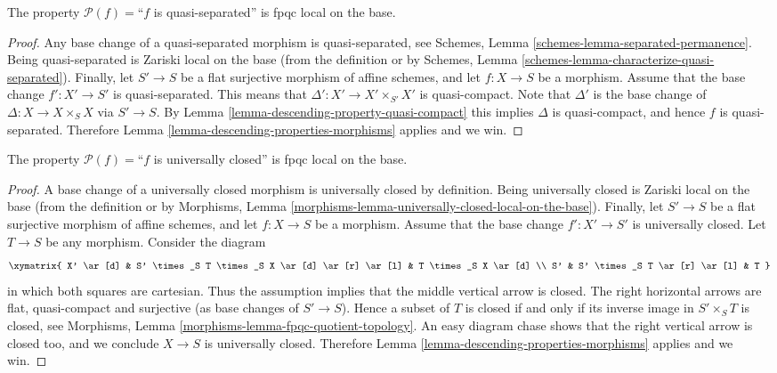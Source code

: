 \begin{lemma}
\label{lemma-descending-property-quasi-separated}
The property $\mathcal{P}(f) =$``$f$ is quasi-separated''
is fpqc local on the base.
\end{lemma}

\begin{proof}
Any base change of a quasi-separated morphism is quasi-separated, see
Schemes, Lemma \ref{schemes-lemma-separated-permanence}.
Being quasi-separated is Zariski local on the base (from the
definition or by
Schemes, Lemma \ref{schemes-lemma-characterize-quasi-separated}).
Finally, let
$S' \to S$ be a flat surjective morphism of affine schemes,
and let $f : X \to S$ be a morphism. Assume that the base change
$f' : X' \to S'$ is quasi-separated. This means that
$\Delta' : X' \to X'\times_{S'} X'$ is quasi-compact.
Note that $\Delta'$ is the base change of $\Delta : X \to X \times_S X$
via $S' \to S$. By Lemma \ref{lemma-descending-property-quasi-compact}
this implies $\Delta$ is quasi-compact, and hence $f$ is
quasi-separated.
Therefore Lemma \ref{lemma-descending-properties-morphisms} applies and we win.
\end{proof}

\begin{lemma}
\label{lemma-descending-property-universally-closed}
The property $\mathcal{P}(f) =$``$f$ is universally closed''
is fpqc local on the base.
\end{lemma}

\begin{proof}
A base change of a universally closed morphism is universally closed
by definition.
Being universally closed is Zariski local on the base (from the
definition or by
Morphisms, Lemma
\ref{morphisms-lemma-universally-closed-local-on-the-base}).
Finally, let
$S' \to S$ be a flat surjective morphism of affine schemes,
and let $f : X \to S$ be a morphism. Assume that the base change
$f' : X' \to S'$ is universally closed. Let $T \to S$ be any morphism.
Consider the diagram
$$
\xymatrix{
X' \ar[d] &
S' \times_S T \times_S X \ar[d] \ar[r] \ar[l] &
T \times_S X \ar[d] \\
S' &
S' \times_S T \ar[r] \ar[l] &
T
}
$$
in which both squares are cartesian.
Thus the assumption implies that the middle vertical
arrow is closed. The right horizontal arrows are flat, quasi-compact
and surjective (as base changes of $S' \to S$).
Hence a subset of $T$ is closed if and only if its inverse
image in $S' \times_S T$ is closed, see Morphisms,
Lemma \ref{morphisms-lemma-fpqc-quotient-topology}.
An easy diagram chase shows that the right vertical
arrow is closed too, and we conclude $X \to S$ is
universally closed.
Therefore Lemma \ref{lemma-descending-properties-morphisms} applies and we win.
\end{proof}

